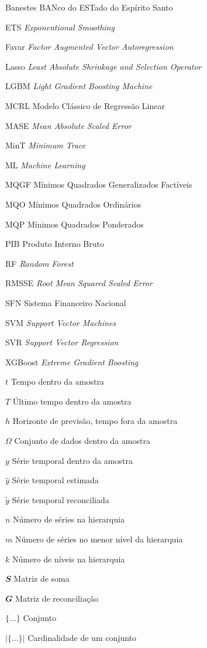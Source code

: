 \begin{siglas}
  \item[Banestes] BANco do ESTado do Espírito Santo
  \item[ETS] \textit{Exponentional Smoothing}
  \item[Favar] \textit{Factor Augmented Vector Autoregression}
  \item[Lasso] \textit{Least Absolute Shrinkage and Selection Operator}
  \item[LGBM] \textit{Light Gradient Boosting Machine}
  \item[MCRL] Modelo Clássico de Regressão Linear
  \item[MASE] \textit{Mean Absolute Scaled Error}
  \item[MinT] \textit{Minimum Trace}
  \item[ML] \textit{Machine Learning}
  \item[MQGF] Mínimos Quadrados Generalizados Factíveis
  \item[MQO] Mínimos Quadrados Ordinários
  \item[MQP] Mínimos Quadrados Ponderados
  \item[PIB] Produto Interno Bruto
  \item[RF] \textit{Random Forest}
  \item[RMSSE] \textit{Root Mean Squared Scaled Error}
  \item[SFN] Sistema Financeiro Nacional
  \item[SVM] \textit{Support Vector Machines}
  \item[SVR] \textit{Support Vector Regression}
  \item[XGBoost] \textit{Extreme Gradient Boosting}
\end{siglas}

\begin{simbolos}
  \item[$ t $] Tempo dentro da amostra
  \item[$ T $] Último tempo dentro da amostra
  \item[$ h $] Horizonte de previsão, tempo fora da amostra
  \item[$ \Omega $] Conjunto de dados dentro da amostra
  \item[$ y $] Série temporal dentro da amostra
  \item[$ \hat{y} $] Série temporal estimada
  \item[$ \tilde{y} $] Série temporal reconciliada
  \item[$ n $] Número de séries na hierarquia
  \item[$ m $] Número de séries no menor nível da hierarquia
  \item[$ k $] Número de níveis na hierarquia
  \item[$ \mathbfit{S} $] Matriz de soma
  \item[$ \mathbfit{G} $] Matriz de reconciliação
  \item[$ \{...\} $] Conjunto
  \item[$ |\{...\}| $] Cardinalidade de um conjunto
\end{simbolos}

\tableofcontents*
\cleardoublepage

\textual
\pagestyle{simple}